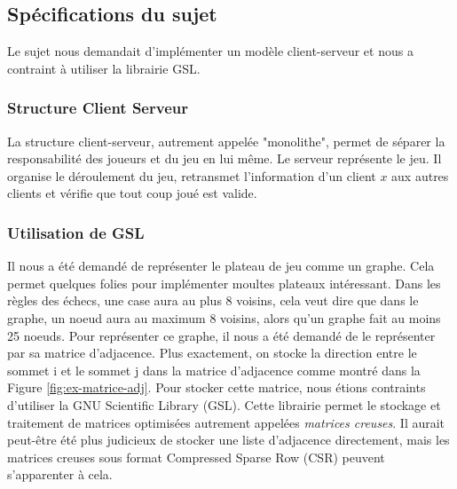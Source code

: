 \subsection{Spécifications du sujet}
Le sujet nous demandait d'implémenter un modèle client-serveur et nous a
contraint à utiliser la librairie GSL.

\subsubsection{Structure Client Serveur}

La structure client-serveur, autrement appelée "monolithe", permet de séparer
la responsabilité des joueurs et du jeu en lui même. Le serveur représente le jeu. Il organise le
déroulement du jeu, retransmet l'information d'un client $x$ aux autres clients et vérifie que tout coup joué est valide.

\subsubsection{Utilisation de GSL}

Il nous a été demandé de représenter le plateau de jeu comme un graphe.
Cela permet quelques folies pour implémenter moultes plateaux intéressant.
Dans les règles des échecs, une case aura au plus 8 voisins, cela veut dire que dans le graphe, un noeud aura au maximum 8 voisins, alors qu'un graphe fait au moins 25 noeuds.
Pour représenter ce graphe, il nous a été demandé de le représenter par sa matrice d'adjacence.
Plus exactement, on stocke la direction entre le sommet i et le sommet j dans la matrice d'adjacence comme montré dans la Figure \ref{fig:ex-matrice-adj}.
Pour stocker cette matrice, nous étions contraints d'utiliser la GNU Scientific Library (GSL).
Cette librairie permet le stockage et traitement de matrices optimisées autrement appelées \textit{matrices creuses}.
Il aurait peut-être été plus judicieux de stocker une liste d'adjacence directement, mais les matrices creuses sous format Compressed Sparse Row (CSR) peuvent s'apparenter à cela.

